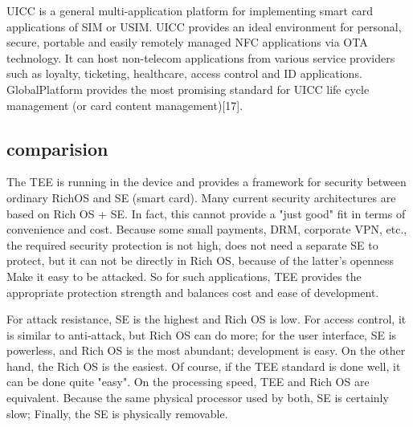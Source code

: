 \documentclass[journal]{IEEEtran}
\begin{document}
UICC is a general multi-application platform for implementing smart card applications of SIM or USIM. UICC provides an ideal environment for personal, secure, portable and easily remotely managed NFC applications via OTA technology. It can host non-telecom applications from various service providers such as loyalty, ticketing, healthcare, access control and ID applications. GlobalPlatform provides the most promising standard for UICC life cycle management (or card content management)[17].


\subsection{comparision}
The TEE is running in the device and provides a framework for security between ordinary RichOS and SE (smart card). Many current security architectures are based on Rich OS + SE. In fact, this cannot provide a "just good" fit in terms of convenience and cost. Because some small payments, DRM, corporate VPN, etc., the required security protection is not high, does not need a separate SE to protect, but it can not be directly in Rich OS, because of the latter's openness Make it easy to be attacked. So for such applications, TEE provides the appropriate protection strength and balances cost and ease of development.

For attack resistance, SE is the highest and Rich OS is low. For access control, it is similar to anti-attack, but Rich OS can do more; for the user interface, SE is powerless, and Rich OS is the most abundant; development is easy. On the other hand, the Rich OS is the easiest. Of course, if the TEE standard is done well, it can be done quite "easy". On the processing speed, TEE and Rich OS are equivalent. Because the same physical processor used by both, SE is certainly slow; Finally, the SE is physically removable.
\end{document}
